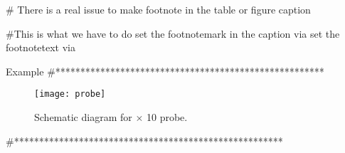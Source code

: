 # There is a real issue to make footnote in the table or figure caption 

#This is what we have to do
   set the footnotemark in the caption via
       \setcounter{footnote}{\value{footnote}}\protect\footnotemark
   set the footnotetext via

Example
#******************************************************  
\begin{figure}[th!]
\centering
\texttt{[image: probe]}
\caption{Schematic diagram for $\times$ 10 probe. \setcounter{footnote}{\value{footnote}}\protect\footnotemark}
\label{probe}
\end{figure}


\addtocounter{footnote}{-1}
#******************************************************  

